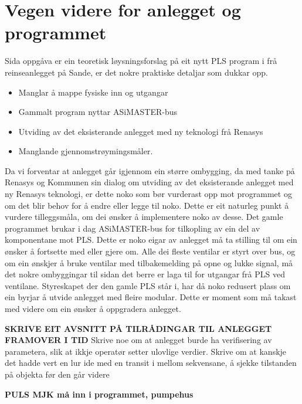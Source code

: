 \section{Vegen videre for anlegget og programmet}
\thispagestyle{fancy}

Sida oppgåva er ein teoretisk løysningsforslag på eit nytt PLS program i frå reinseanlegget på Sande, er det nokre praktiske detaljar som dukkar opp.

\begin{itemize}
    \item Manglar å mappe fysiske inn og utgangar
    \item Gammalt program nyttar ASiMASTER-bus  
    \item Utviding av det eksisterande anlegget med ny teknologi frå Renasys
    \item Manglande gjennomstrøymingsmåler.
\end{itemize}

Da vi forventar at anlegget går igjennom ein større ombygging,  da med tanke på Renasys og Kommunen sin dialog om utviding av det eksisterande anlegget med ny Renasys teknologi, er dette noko som bør vurderast opp mot programmet og om det blir behov for å endre eller legge til noko. 
Dette er eit naturleg punkt å vurdere tilleggsmåla, om dei ønsker å implementere noko av desse.
Det gamle programmet brukar i dag ASiMASTER-bus for tilkopling av ein del av komponentane mot PLS. 
Dette er noko eigar av anlegget må ta stilling til om ein ønsker å fortsette med eller gjere om. Alle dei fleste ventilar er styrt over bus, og om ein ønskjer å bruke ventilar med tilbakemelding på opne og lukke signal, må det nokre ombyggingar til sidan det berre er laga til for utgangar frå PLS ved ventilane.
Styreskapet der den gamle PLS står i, har då noko redusert plass om ein byrjar å utvide anlegget med fleire modular. 
Dette er moment som må takast med videre om ein ønsker å oppgradera anlegget. 

\textbf{SKRIVE EIT AVSNITT PÅ TILRÅDINGAR TIL ANLEGGET FRAMOVER I TID}
        Skrive noe om at anlegget burde ha verifisering av parametera, slik at 
            ikkje operatør setter ulovlige verdier.
        Skrive om at kanskje det hadde vert en lur ide med en transit i mellom sekvensane, å sjekke tilstanden på objekta før den går videre

\textbf{PULS MJK må inn i programmet, pumpehus}